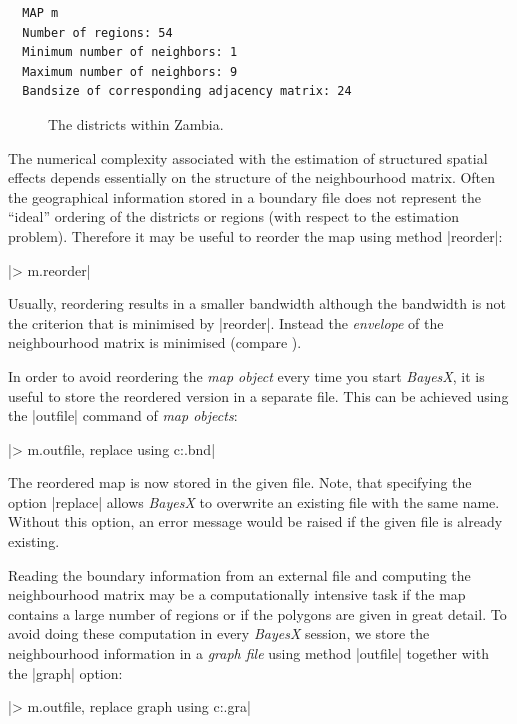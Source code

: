 \begin{verbatim}
  MAP m
  Number of regions: 54
  Minimum number of neighbors: 1
  Maximum number of neighbors: 9
  Bandsize of corresponding adjacency matrix: 24
\end{verbatim}

\begin{figure}[ht]
\begin{center}
 {\it\caption{The
districts within Zambia.\label{step:zambiamap}}}
\end{center}
\end{figure}


The numerical complexity associated with the estimation of structured spatial effects depends essentially on the structure of
the neighbourhood matrix. Often the geographical information stored in a boundary file does not represent the ``ideal''
ordering of the districts or regions (with respect to the estimation problem). Therefore it may be useful to reorder the map
using method |reorder|:

|> m.reorder|

Usually, reordering results in a smaller bandwidth although the bandwidth is not the criterion that is minimised by |reorder|.
Instead the {\it envelope} of the neighbourhood matrix is minimised (compare ).

In order to avoid reordering the {\it map object} every time you start {\it BayesX}, it is useful to store the reordered
version in a separate file. This can be achieved using the |outfile| command of {\it map objects}:

|> m.outfile, replace using c:\data\zambiasort.bnd|

The reordered map is now stored in the given file. Note, that specifying the option |replace| allows {\it BayesX} to overwrite
an existing file with the same name. Without this option, an error message would be raised if the given file is already
existing.

Reading the boundary information from an external file and computing the neighbourhood matrix may be a computationally
intensive task if the map contains a large number of regions or if the polygons are given in great detail. To avoid doing these
computation in every {\it BayesX} session, we store the neighbourhood information in a {\it graph file} using method |outfile|
together with the |graph| option:

|> m.outfile, replace graph using c:\data\zambiasort.gra|

